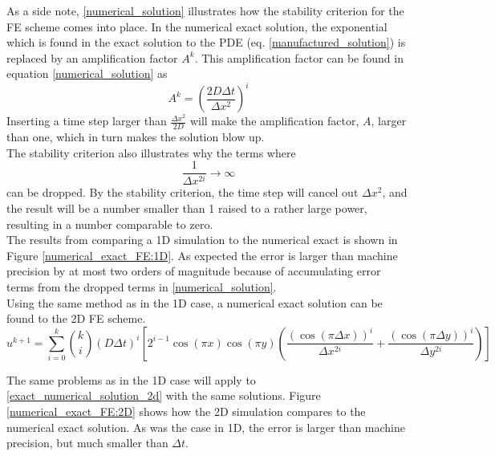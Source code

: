 As a side note, \eqref{numerical_solution} illustrates how the stability criterion for the FE scheme comes into place. 
In the numerical exact solution, the exponential which is found in the exact solution to the PDE (eq. \ref{manufactured_solution}) is replaced by an amplification factor $A^k$.
This amplification factor can be found in equation \eqref{numerical_solution} as 
\begin{equation}
A^k = \left(\frac{2D\Delta t}{\Delta x^2}\right)^i
\end{equation}
Inserting a time step larger than $\frac{\Delta x^2}{2D}$ will make the amplification factor, $A$, larger than one, which in turn makes the solution blow up. \\

\noindent The stability criterion also illustrates why the terms where 
$$ \frac{1}{\Delta x^{2i}} \to \infty$$
 can be dropped. 
 By the stability criterion, the time step will cancel out $\Delta x^2$, and the result will be a number smaller than 1 raised to a rather large power, resulting in a number comparable to zero.\\
 
 The results from comparing a 1D simulation to the numerical exact is shown in Figure \ref{numerical_exact_FE:1D}. 
 As expected the error is larger than machine precision by at most two orders of magnitude because of accumulating error terms from the dropped terms in \eqref{numerical_solution}.\\
 
\noindent Using the same method as in the 1D case, a numerical exact solution can be found to the 2D FE scheme. 
 \begin{equation}\label{exact_numerical_solution_2d}
 u^{k+1} = \sum\limits^k_{i=0}{k\choose i}\left(D\Delta t\right)^i\left[2^{i-1}\cos(\pi x)\cos(\pi y)\left(\frac{(\cos(\pi\Delta x))^i}{\Delta x^{2i}} +\frac{(\cos(\pi\Delta y))^i}{\Delta y^{2i}}\right)\right]
\end{equation}

The same problems as in the 1D case will apply to \eqref{exact_numerical_solution_2d} with the same solutions. 
Figure \ref{numerical_exact_FE:2D} shows how the 2D simulation compares to the numerical exact solution. 
As was the case in 1D, the error is larger than machine precision, but much smaller than $\Delta t$.

